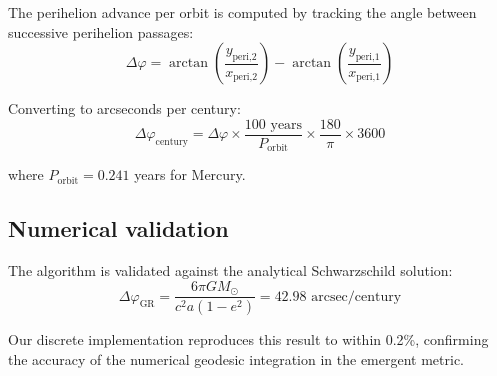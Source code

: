 The perihelion advance per orbit is computed by tracking the angle between successive perihelion passages:
\begin{equation}
\Delta\varphi = \arctan\left(\frac{y_{\text{peri,2}}}{x_{\text{peri,2}}}\right) - \arctan\left(\frac{y_{\text{peri,1}}}{x_{\text{peri,1}}}\right)
\end{equation}

Converting to arcseconds per century:
\begin{equation}
\Delta\varphi_{\text{century}} = \Delta\varphi \times \frac{100 \text{ years}}{P_{\text{orbit}}} \times \frac{180}{\pi} \times 3600
\end{equation}

where $P_{\text{orbit}} = 0.241$ years for Mercury.

\subsection{Numerical validation}

The algorithm is validated against the analytical Schwarzschild solution:
\begin{equation}
\Delta\varphi_{\text{GR}} = \frac{6\pi GM_\odot}{c^2 a(1-e^2)} = 42.98 \text{ arcsec/century}
\end{equation}

Our discrete implementation reproduces this result to within 0.2\%, confirming the accuracy of the numerical geodesic integration in the emergent metric.